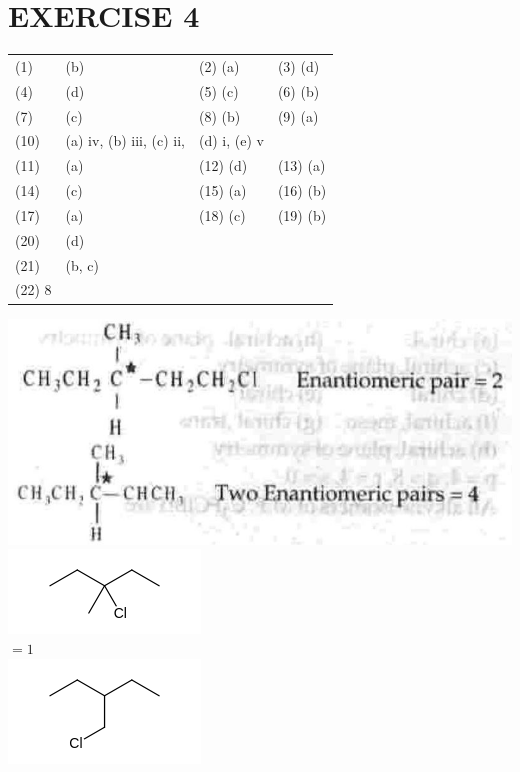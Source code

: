 \documentclass[10pt]{article}
\begin{document}
\section*{EXERCISE 4}
\begin{center}
\begin{tabular}{llll}
(1) & (b) & (2) (a) & (3) (d) \\
(4) & (d) & (5) (c) & (6) (b) \\
(7) & (c) & (8) (b) & (9) (a) \\
(10) & (a) iv, (b) iii, (c) ii, & (d) i, (e) v &  \\
(11) & (a) & (12) (d) & (13) (a) \\
(14) & (c) & (15) (a) & (16) (b) \\
(17) & (a) & (18) (c) & (19) (b) \\
(20) & (d) &  &  \\
(21) & (b, c) &  &  \\
(22) 8 &  &  &  \\
\end{tabular}
\end{center}

\includegraphics[max width=\textwidth, center]{2025_01_28_8470952b98110cec3aabg-168(2)}\\
\includegraphics{smile-0673148c23f6f08854498b7c1dcf49fd570d676e}\\
$=1$\\
\includegraphics{smile-61b8f449ed487eca6f49f55ca4d9e650e78b876a}
\end{document}

